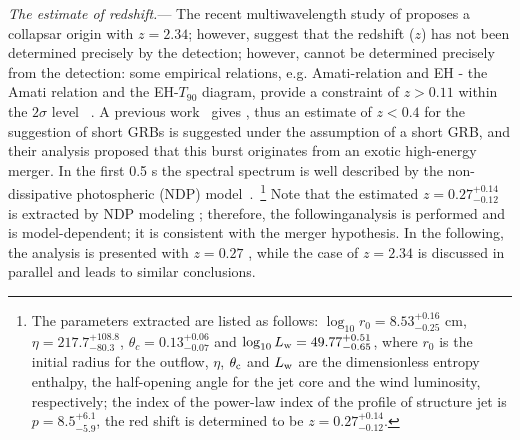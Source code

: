 \documentclass[linenumbers,twocolumn]{aastex631}
\providecommand{\DIFaddtex}[1]{{\protect\color{blue} \sf #1}} %
\providecommand{\DIFdeltex}[1]{{\protect\color{red} \scriptsize #1}} %
\providecommand{\DIFaddbegin}{} %
\providecommand{\DIFaddend}{} %
\providecommand{\DIFdelbegin}{} %
\providecommand{\DIFdelend}{} %
\providecommand{\DIFadd}[1]{\texorpdfstring{\DIFaddtex{#1}}{#1}} %
\providecommand{\DIFdel}[1]{\texorpdfstring{\DIFdeltex{#1}}{}} %
\begin{document}
 


\textit{The estimate of redshift.}--- The \DIFaddbegin \DIFadd{recent multiwavelength study of \cite{2026MNRAS.548ag555P} proposes a collapsar origin with $z=2.34$; however, \cite{2023MNRAS.522.5204B} suggest that the }\DIFaddend redshift ($z$) \DIFdelbegin \DIFdel{has not been determined precisely by the detection; however, }\DIFdelend \DIFaddbegin \DIFadd{cannot be determined precisely from the detection: }\DIFaddend some empirical relations, e.g. \DIFdelbegin \DIFdel{Amati-relation and EH - }\DIFdelend \DIFaddbegin \DIFadd{the Amati relation and the EH-}\DIFaddend $T_{90}$ diagram, provide a constraint of $z>0.11$ within the $2\sigma$ level~\citep{2021GCN.30452....1M}\DIFdelbegin \DIFdel{. A previous work~\citep{2023MNRAS.522.5204B} gives }\DIFdelend \DIFaddbegin \DIFadd{, thus }\DIFaddend an estimate of $z<0.4$ \DIFdelbegin \DIFdel{for the suggestion of short GRBs}\DIFdelend \DIFaddbegin \DIFadd{is suggested under the assumption of a short GRB}\DIFaddend , and their analysis proposed that this burst originates from an exotic high-energy merger. In the first 0.5 s the \DIFdelbegin \DIFdel{spectral }\DIFdelend \DIFaddbegin \DIFadd{spectrum }\DIFaddend is well described by the non-dissipative photospheric (NDP) model~\citep[e.g.,][]{2013A,Deng_2014,2022MNRAS.512.5693S,2022ApJ...931..112S}.~\footnote{The parameters extracted are listed as follows: $\log_{10} r_0=8.53^{+0.16}_{-0.25}$ cm, $\eta=217.7^{+108.8}_{-80.3}$, $\theta_c=0.13^{+0.06}_{-0.07}$ and $\log_{10} L_{\rm w}=49.77^{+0.51}_{-0.65}$, where $r_0$ is the initial radius for the outflow, $\eta$, $\theta_{\rm c}$ and $L_{\rm w}$ are the dimensionless \DIFdelbegin \DIFdel{entropy}\DIFdelend \DIFaddbegin \DIFadd{enthalpy}\DIFaddend , the half-opening angle for the jet core and the wind luminosity, respectively; the index of the power-law index of the profile of structure jet is $p=8.5^{+6.1}_{-5.9}$, the red shift is determined to be $z=0.27^{+0.14}_{-0.12}$.}
Note that the estimated $z=0.27^{+0.14}_{-0.12}$ is extracted by NDP modeling \DIFdelbegin \DIFdel{; therefore, the followinganalysis is performed }\DIFdelend \DIFaddbegin \DIFadd{and is model-dependent; it is consistent with the merger hypothesis. In the following, the analysis is presented }\DIFaddend with $z=0.27$\DIFaddbegin \DIFadd{, while the case of $z=2.34$ is discussed in parallel and leads to similar conclusions}\DIFaddend .
\end{document}
